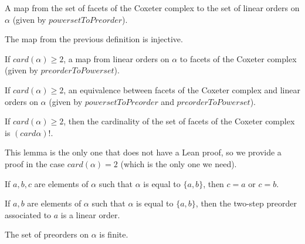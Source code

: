 \begin{subdefi}[CoxeterComplexFacetstoLinearOrders]
A map from the set of facets of the Coxeter complex to the set of linear orders on $\alpha$ (given by $powersetToPreorder$).

\end{subdefi}

\begin{sublemma}
The map from the previous definition is injective.

\end{sublemma}

\begin{subdefi}[LinearOrderstoCoxeterComplexFacets]
If $card(\alpha)\geq 2$, a map from linear orders on $\alpha$ to facets of the Coxeter complex (given by $preorderToPowerset$).

\end{subdefi}

\begin{subdefi}[FacetsCoxeterComplextoLinearOrders]
If $card(\alpha)\geq 2$, an equivalence between facets of the Coxeter complex and linear orders on $\alpha$ (given by $powersetToPreorder$ and
$preorderToPowerset$).

\end{subdefi}

\begin{sublemma}
If $card(\alpha)\geq 2$, then the cardinality of the set of facets of the Coxeter complex is $(card \alpha)!$.

\end{sublemma}

This lemma is the only one that does not have a Lean proof, so we provide a proof in the case $card(\alpha)=2$ (which is the only one we need).

\begin{sublemma}
If $a,b,c$ are elements of $\alpha$ such that $\alpha$ is equal to $\{a,b\}$, then $c=a$ or $c=b$.

\end{sublemma}

\begin{sublemma}
If $a,b$ are elements of $\alpha$ such that $\alpha$ is equal to $\{a,b\}$, then the two-step preorder associated to $a$ is a linear order.

\end{sublemma}

\begin{sublemma}[fintypePreorder]
The set of preorders on $\alpha$ is finite.

\end{sublemma}

